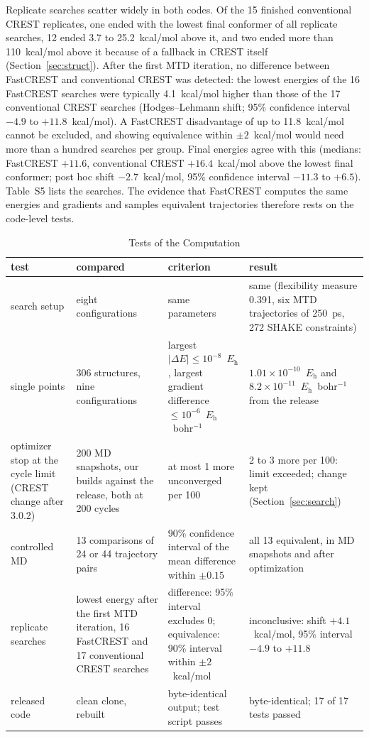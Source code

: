 \documentclass[journal=jctcce,manuscript=article]{achemso}
\newcommand{\Eh}{\ensuremath{E_\mathrm{h}}}
\begin{document}
Replicate searches scatter widely in both codes. Of the 15 finished conventional CREST replicates, one ended with the lowest final conformer of all replicate searches, 12 ended 3.7 to 25.2~kcal/mol above it, and two ended more than 110~kcal/mol above it because of a fallback in CREST itself (Section~\ref{sec:struct}). After the first MTD iteration, no difference between FastCREST and conventional CREST was detected: the lowest energies of the 16 FastCREST searches were typically 4.1~kcal/mol higher than those of the 17 conventional CREST searches (Hodges--Lehmann shift; 95\% confidence interval $-4.9$ to $+11.8$~kcal/mol). A FastCREST disadvantage of up to 11.8~kcal/mol cannot be excluded, and showing equivalence within $\pm2$~kcal/mol would need more than a hundred searches per group. Final energies agree with this (medians: FastCREST $+11.6$, conventional CREST $+16.4$~kcal/mol above the lowest final conformer; post hoc shift $-2.7$~kcal/mol, 95\% confidence interval $-11.3$ to $+6.5$). Table~S5 lists the searches. The evidence that FastCREST computes the same energies and gradients and samples equivalent trajectories therefore rests on the code-level tests.

\begin{table}[tbp]
\centering
\caption{Tests of the Computation}
\label{tab:tests}
\small
\begin{tabular}{@{}L{0.16\textwidth}L{0.24\textwidth}L{0.24\textwidth}L{0.28\textwidth}@{}}
\toprule
test & compared & criterion & result \\
\midrule
search setup & eight configurations & same parameters & same (flexibility measure 0.391, six MTD trajectories of 250~ps, 272 SHAKE constraints\cite{shake}) \\
single points & 306 structures, nine configurations & largest $|\Delta E| \le 10^{-8}$~\Eh, largest gradient difference $\le 10^{-6}$~\Eh~bohr$^{-1}$ & $1.01\times10^{-10}$~\Eh{} and $8.2\times10^{-11}$~\Eh~bohr$^{-1}$ from the release \\
optimizer stop at the cycle limit (CREST change after 3.0.2) & 200 MD snapshots, our builds against the release, both at 200 cycles & at most 1 more unconverged per 100 & 2 to 3 more per 100: limit exceeded; change kept (Section~\ref{sec:search}) \\
controlled MD & 13 comparisons of 24 or 44 trajectory pairs & 90\% confidence interval of the mean difference within $\pm0.15$ & all 13 equivalent, in MD snapshots and after optimization \\
replicate searches & lowest energy after the first MTD iteration, 16 FastCREST and 17 conventional CREST searches & difference: 95\% interval excludes 0; equivalence: 90\% interval within $\pm2$~kcal/mol & inconclusive: shift $+4.1$~kcal/mol, 95\% interval $-4.9$ to $+11.8$ \\
released code & clean clone, rebuilt & byte-identical output; test script passes & byte-identical; 17 of 17 tests passed \\
\bottomrule
\end{tabular}
\end{table}
\end{document}
